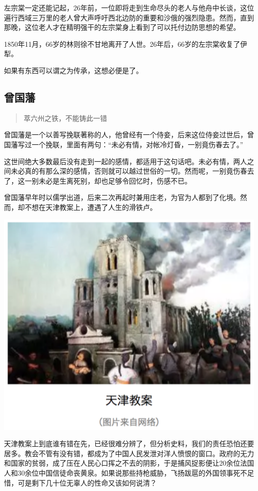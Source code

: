 \documentclass[]{book}
\begin{document}
左宗棠一定还能记起，26年前，一位即将走到生命尽头的老人与他舟中长谈，这位遍行西域三万里的老人曾大声呼吁西北边防的重要和沙俄的强烈隐患。然而，直到那晚，这位老人才在精明强干的左宗棠身上看到了可以托付边防思想的希望。

1850年11月，66岁的林则徐不甘地离开了人世。26年后，66岁的左宗棠收复了伊犁。

如果有东西可以谓之为传承，这想必便是了。

\subsection{曾国藩}

\begin{quote}
萃六州之铁，不能铸此一错
\end{quote}

曾国藩是一个以善写挽联著称的人，他曾经有一个侍妾，后来这位侍妾过世后，曾国藩写过一个挽联，里面有两句：``未必有情，对帐冷灯昏，一别竟伤春去了。''

这世间绝大多数最后没有走到一起的感情，都适用于这句话吧。未必有情，两人之间未必真的有那么深的感情，否则就可以越过世俗的一切。然而呢，一别竟伤春去了，这一别未必是生离死别，却也足够令回忆时，伤感不已。

曾国藩早年时以儒学出道，后来二次再起时兼用庄老，为官为人都到了化境。然而，却不想在天津教案上，遭遇了人生的滑铁卢。

\includegraphics[width=6.67in]{images/his3}

天津教案上到底谁有错在先，已经很难分辨了，但分析史料，我们的责任恐怕还要居多。教会不管有没有错，都成为了中国人民发泄对洋人愤恨的窗口。政府的无力和国家的贫弱，成了压在人民心口挥之不去的阴影，于是捕风捉影便让20余位法国人和30余位中国信徒命丧黄泉。如果说那些持枪威胁，飞扬跋扈的外国领事死不足惜，可是剩下几十位无辜人的性命又该如何说清？
\end{document}
